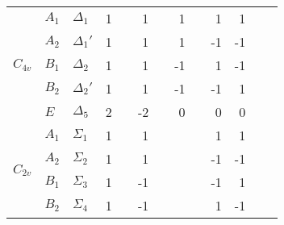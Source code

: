 \documentclass[preprint,showpacs,preprintnumbers,superscriptaddress,prb,floatfix,aps]{revtex4-1}
\begin{document}
\begin{table}
\begin{ruledtabular}
\begin{tabular*}{10cm}{lllrrrrrrrrrr}
\multirow{5}{*}{$C_{4v}$}    & $A_1$           & $\Delta_{1}  $  &  1  &        &     1  &        &     1  &      &          1  &          1  &             &             \\         %
                             & $A_2$           & $\Delta_{1}' $  &  1  &        &     1  &        &     1  &      &         -1  &         -1  &             &             \\         %
                             & $B_1$           & $\Delta_{2}  $  &  1  &        &     1  &        &    -1  &      &          1  &         -1  &             &             \\         %
                             & $B_2$           & $\Delta_{2}' $  &  1  &        &     1  &        &    -1  &      &         -1  &          1  &             &             \\         %
                             & $E$             & $\Delta_{5}  $  &  2  &        &    -2  &        &     0  &      &          0  &          0  &             &             \\ \hline  %

\multirow{4}{*}{$C_{2v}$}    & $A_{1}$         & $\Sigma_{1}  $  &  1  &        &     1  &        &        &      &          1  &          1  &             &             \\
                             & $A_{2}$         & $\Sigma_{2}  $  &  1  &        &     1  &        &        &      &         -1  &         -1  &             &             \\
                             & $B_{1}$         & $\Sigma_{3}  $  &  1  &        &    -1  &        &        &      &         -1  &          1  &             &             \\
                             & $B_{2}$         & $\Sigma_{4}  $  &  1  &        &    -1  &        &        &      &          1  &         -1  &             &             \\ \hline


\end{tabular*}
\end{ruledtabular}
\end{table}
\end{document}
